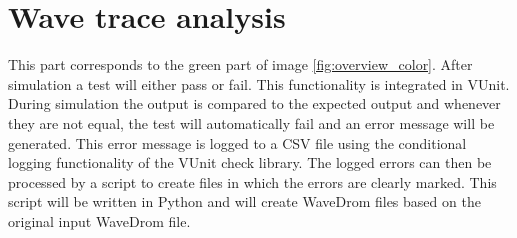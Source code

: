 \section{Wave trace analysis}
This part corresponds to the green part of image \ref{fig:overview_color}. After simulation a test will either pass or fail. This functionality is integrated in VUnit. During simulation the output is compared to the expected output and whenever they are not equal, the test will automatically fail and an error message will be generated. This error message is logged to a CSV file using the conditional logging functionality of the VUnit check library.
\npar
The logged errors can then be processed by a script to create files in which the errors are clearly marked. This script will be written in Python and will create WaveDrom files based on the original input WaveDrom file.